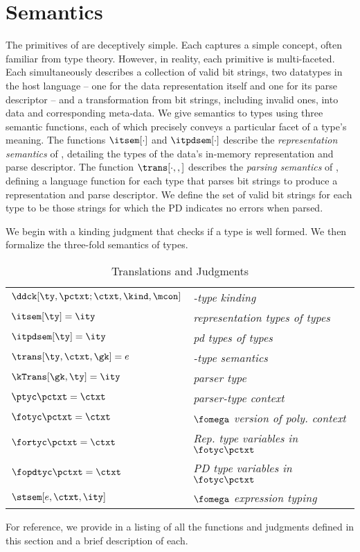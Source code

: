 \section{\ddc{} Semantics}
\label{sec:ddc-sem}

The primitives of \ddc{} are deceptively simple.  Each captures a
simple concept, often familiar from type theory. However, in reality,
each primitive is multi-faceted. Each simultaneously describes a
collection of valid bit strings, two datatypes in the host language --
one for the data representation itself and one for its parse
descriptor -- and a transformation from bit strings, including
invalid ones, into data and corresponding meta-data.
We give semantics to \ddc{} types using three semantic functions, each
of which precisely conveys a particular facet of a type's meaning.
The functions $\itsem[\cdot]$ and $\itpdsem[\cdot]$ describe the {\it
  representation semantics} of \ddc{}, detailing the types of the
data's in-memory representation and parse descriptor. The function
$\trans[\cdot,,]$ describes the {\it parsing semantics} of \ddc{},
defining a \implang{} language function for each type that parses bit
strings to produce a representation and parse descriptor. We define
the set of valid bit strings for each type to be those strings for
which the PD indicates no errors when parsed.

We begin with a kinding judgment that checks if
a type is well formed. We then formalize
the three-fold semantics of \ddc{} types.

\begin{table}
  \begin{center}
    \renewcommand{\arraystretch}{1.35}
    \begin{tabular}{l l}
      $\ddck[\ty,{\pctxt;\ctxt},\kind,\mcon]$ & {\it \ddc{}-type
        kinding}\\
      $\itsem[\ty] = \ity$ & {\it representation types of \ddc{} types}\\
      $\itpdsem[\ty] = \ity$ & {\it pd types of \ddc{} types}\\
      $\trans[\ty,\ctxt,\gk] = e$   & {\it \ddc{}-type semantics} \\
      $\kTrans[\gk,\ty] = \ity$     & {\it parser type} \\
      $\ptyc \pctxt = \ctxt$     & {\it parser-type context }\\
      $\fotyc \pctxt = \ctxt$     & {\it $\fomega$ version of poly. context }\\
      $\fortyc \pctxt = \ctxt$     & {\it Rep. type variables in $\fotyc \pctxt$ }\\
      $\fopdtyc \pctxt = \ctxt$     & {\it PD type variables in $\fotyc \pctxt$ }\\
      $\stsem[e,\ctxt,\ity]$ & {\it $\fomega$ expression typing} \\
    \end{tabular}
    \caption{Translations and Judgments}
    \label{tab:judg-list}
  \end{center}
\end{table}
For reference, we provide in
 a listing of all the functions and judgments
defined in this section and a brief description of each.  


